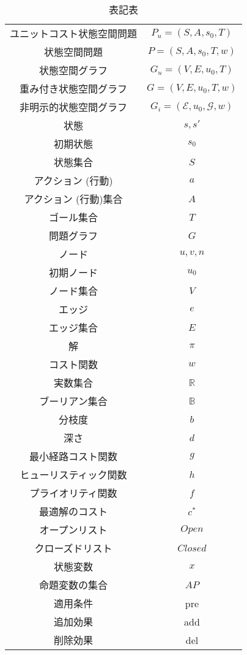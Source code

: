 \begin{table}
	\centering
	\begin{tabular}{c | c}
	ユニットコスト状態空間問題 & $P_{u} = (S, A, s_0, T)$ \\
	状態空間問題 & $P = (S, A, s_0, T, w)$ \\
	状態空間グラフ & $G_{u} = (V, E, u_0, T)$ \\
	重み付き状態空間グラフ & $G = (V, E, u_0, T, w)$ \\
	非明示的状態空間グラフ & $G_{i} = (\mathcal{E}, u_0, \mathcal{G}, w)$ \\
	状態 & $s, s'$ \\ 
	初期状態 & $s_0$ \\ 
	状態集合 & $S$ \\
	アクション (行動) & $a$ \\
	アクション (行動)集合 & $A$ \\
	ゴール集合 & $T$ \\
	問題グラフ & $G$ \\
	ノード & $u, v, n$ \\
	初期ノード & $u_0$ \\
	ノード集合 & $V$ \\
	エッジ & $e$ \\
	エッジ集合 & $E$ \\
	解 & $\pi$ \\
	コスト関数 & $w$ \\
	実数集合 & $\mathbb{R}$ \\
	ブーリアン集合 & $\mathbb{B}$ \\
	分枝度 & $b$ \\
	深さ & $d$ \\
	最小経路コスト関数 & $g$ \\
	ヒューリスティック関数 & $h$ \\
	プライオリティ関数 & $f$ \\
	最適解のコスト & $c^*$ \\
	オープンリスト & $Open$ \\
	クローズドリスト & $Closed$ \\
	状態変数 & $x$ \\
	命題変数の集合 & $AP$ \\
	適用条件 & pre \\
	追加効果 & add \\
	削除効果 & del \\
	\end{tabular}
	\caption{表記表}
	\label{notation}
\end{table}

